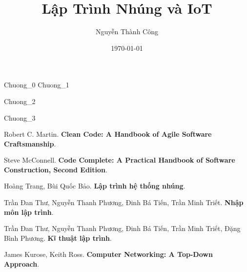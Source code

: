 \documentclass[12pt,a5paper]{book}
\title{Lập Trình Nhúng và IoT}
\date{\today}
\author{Nguyễn Thành Công}
\begin{document}
\maketitle
 {Chuong_0}
\tableofcontents
 {Chuong_1}

 {Chuong_2}

 {Chuong_3}


\begin{thebibliography}{9}
Robert C. Martin. 
\textbf{Clean Code: A Handbook of Agile Software Craftsmanship}. 
 
Steve McConnell.
\textbf{Code Complete: A Practical Handbook of Software Construction, Second Edition}.

Hoàng Trang, Bùi Quốc Bảo.
\textbf{Lập trình hệ thống nhúng}.

Trần Đan Thư, Nguyễn Thanh Phương, Đinh Bá Tiến, Trần Minh Triết.
\textbf{Nhập môn lập trình}.

Trần Đan Thư, Nguyễn Thanh Phương, Đinh Bá Tiến, Trần Minh Triết, Đặng Bình Phương.
\textbf{Kĩ thuật lập trình}.

James Kurose, Keith Ross.
\textbf{Computer Networking: A Top-Down Approach}.

\end{thebibliography}
\end{document}
